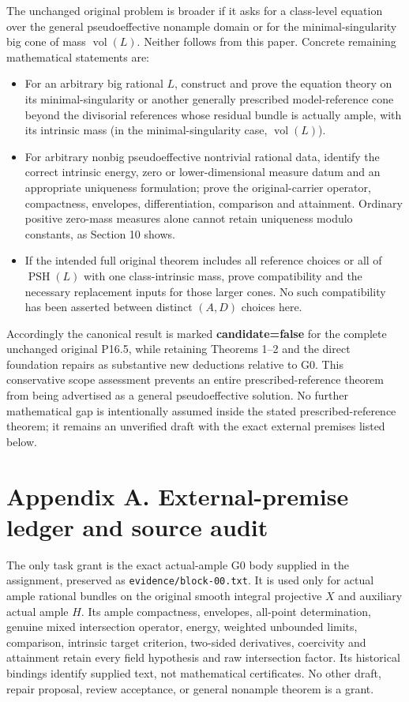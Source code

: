 \documentclass[
  10pt,
]{article}
\providecommand{\tightlist}{%
  \setlength{\itemsep}{0pt}\setlength{\parskip}{0pt}}
\begin{document}
The unchanged original problem is broader if it asks for a class-level
equation over the general pseudoeffective nonample domain or for the
minimal-singularity big cone of mass \(\operatorname{vol}(L)\). Neither
follows from this paper. Concrete remaining mathematical statements are:

\begin{itemize}
\tightlist
\item
  For an arbitrary big rational \(L\), construct and prove the equation
  theory on its minimal-singularity or another generally prescribed
  model-reference cone beyond the divisorial references whose residual
  bundle is actually ample, with its intrinsic mass (in the
  minimal-singularity case, \(\operatorname{vol}(L)\)).
\item
  For arbitrary nonbig pseudoeffective nontrivial rational data,
  identify the correct intrinsic energy, zero or lower-dimensional
  measure datum and an appropriate uniqueness formulation; prove the
  original-carrier operator, compactness, envelopes, differentiation,
  comparison and attainment. Ordinary positive zero-mass measures alone
  cannot retain uniqueness modulo constants, as Section 10 shows.
\item
  If the intended full original theorem includes all reference choices
  or all of \(\operatorname{PSH}(L)\) with one class-intrinsic mass,
  prove compatibility and the necessary replacement inputs for those
  larger cones. No such compatibility has been asserted between distinct
  \((A,D)\) choices here.
\end{itemize}

Accordingly the canonical result is marked \textbf{candidate=false} for
the complete unchanged original P16.5, while retaining Theorems 1--2 and
the direct foundation repairs as substantive new deductions relative to
G0. This conservative scope assessment prevents an entire
prescribed-reference theorem from being advertised as a general
pseudoeffective solution. No further mathematical gap is intentionally
assumed inside the stated prescribed-reference theorem; it remains an
unverified draft with the exact external premises listed below.

\section{Appendix A. External-premise ledger and source
audit}\label{appendix-a.-external-premise-ledger-and-source-audit}

The only task grant is the exact actual-ample G0 body supplied in the
assignment, preserved as \texttt{evidence/block-00.txt}. It is used only
for actual ample rational bundles on the original smooth integral
projective \(X\) and auxiliary actual ample \(H\). Its ample
compactness, envelopes, all-point determination, genuine mixed
intersection operator, energy, weighted unbounded limits, comparison,
intrinsic target criterion, two-sided derivatives, coercivity and
attainment retain every field hypothesis and raw intersection factor.
Its historical bindings identify supplied text, not mathematical
certificates. No other draft, repair proposal, review acceptance, or
general nonample theorem is a grant.
\end{document}
